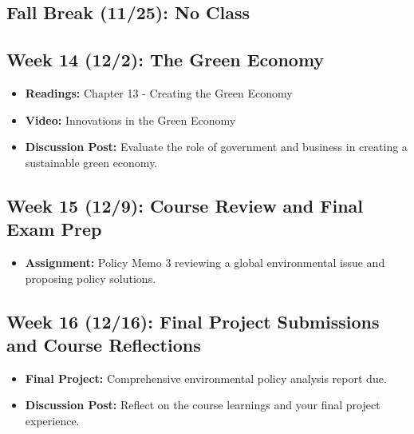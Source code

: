 \documentclass[12pt, letterpaper]{article}
\begin{document}
\subsection*{Fall Break (11/25): No Class}

\subsection*{Week 14 (12/2): The Green Economy}
\begin{itemize}
    \item \textbf{Readings:} Chapter 13 - Creating the Green Economy
    \item \textbf{Video:} Innovations in the Green Economy
    \item \textbf{Discussion Post:} Evaluate the role of government and business in creating a sustainable green economy.
\end{itemize}

\subsection*{Week 15 (12/9): Course Review and Final Exam Prep}
\begin{itemize}
    \item \textbf{Assignment:} Policy Memo 3 reviewing a global environmental issue and proposing policy solutions.
\end{itemize}

\subsection*{Week 16 (12/16): Final Project Submissions and Course Reflections}
\begin{itemize}
    \item \textbf{Final Project:} Comprehensive environmental policy analysis report due.
    \item \textbf{Discussion Post:} Reflect on the course learnings and your final project experience.
\end{itemize}
\end{document}
